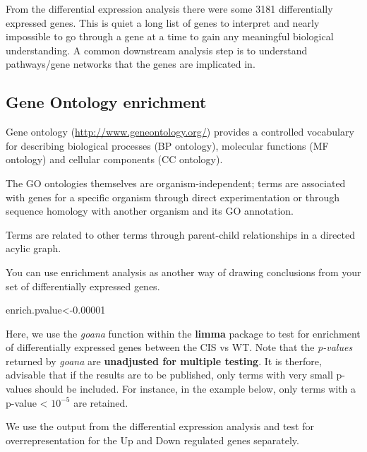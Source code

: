 \documentclass[]{book}
\newenvironment{Shaded}{\begin{snugshade}}{\end{snugshade}}
\newcommand{\FloatTok}[1]{\textcolor[rgb]{0.00,0.00,0.81}{#1}}
\newcommand{\NormalTok}[1]{#1}
\begin{document}
From the differential expression analysis there were some 3181 differentially expressed genes. This is quiet a long list of genes to interpret and nearly impossible to go through a gene at a time to gain any meaningful biological understanding. A common downstream analysis step is to understand pathways/gene networks that the genes are implicated in.

\hypertarget{gene-ontology-enrichment}{%
\subsection{Gene Ontology enrichment}\label{gene-ontology-enrichment}}

Gene ontology (\url{http://www.geneontology.org/}) provides a controlled vocabulary for describing biological processes (BP ontology), molecular functions (MF ontology) and cellular components (CC ontology).

The GO ontologies themselves are organism-independent; terms are associated with genes for a specific organism through direct experimentation or through sequence homology with another organism and its GO annotation.

Terms are related to other terms through parent-child relationships in a directed acylic graph.

You can use enrichment analysis as another way of drawing conclusions from your set of differentially expressed genes.

\begin{Shaded}
\begin{Highlighting}[]
\NormalTok{enrich.pvalue<-}\FloatTok{0.00001}
\end{Highlighting}
\end{Shaded}

Here, we use the \emph{goana} function within the \textbf{limma} package to test for enrichment of differentially expressed genes between the CIS vs WT. Note that the \emph{p-values} returned by \emph{goana} are \textbf{unadjusted for multiple testing}. It is therfore, advisable that if the results are to be published, only terms with very small p-values should be included. For instance, in the example below, only terms with a p-value \textless{} \ensuremath{10^{-5}} are retained.

We use the output from the differential expression analysis and test for overrepresentation for the Up and Down regulated genes separately.
\end{document}
